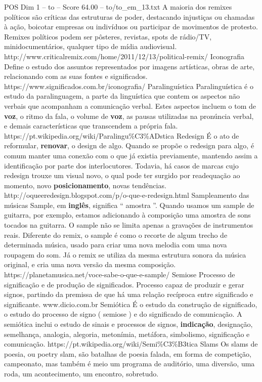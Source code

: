 \begin{textsample}{POS Dim 1 – to – Score 64.00 – to/to\_em\_13.txt}
A maioria dos remixes políticos são críticas das estruturas de poder, destacando injustiças ou chamadas à ação, boicotar empresas ou indivíduos ou participar de movimentos de protesto.
Remixes políticos podem ser pôsteres, revistas, spots de rádio/TV, minidocumentários, qualquer tipo de mídia audiovisual. http://www.criticalremix.com/home/2011/12/13/political-remix/ Iconografia Define o estudo dos assuntos representados por imagens artísticas, obras de arte, relacionando com as suas fontes e significados. https://www.significados.com.br/iconografia/ Paralinguística Paralinguística é o estudo da paralinguagem, a parte da linguística que contem os aspectos não verbais que acompanham a comunicação verbal.
Estes aspectos incluem o tom de \textbf{voz}, o ritmo da fala, o volume de \textbf{voz}, as pausas utilizadas na pronúncia verbal, e demais características que transcendem a própria fala. https://pt.wikipedia.org/wiki/Paralingu\%C3\%ADstica Redesign É o ato de reformular, \textbf{renovar}, o design de algo.
Quando se propõe o redesign para algo, é comum manter uma conexão com o que já existia previamente, mantendo assim a identificação por parte dos interlocutores.
Todavia, há casos de marcas cujo redesign trouxe um visual novo, o qual pode ter surgido por readequação ao momento, novo \textbf{posicionamento}, novas tendências. http://oqueeredesign.blogspot.com/p/o-que-e-redesign.html Sampleamento das músicas Sample, em \textbf{inglês}, significa “ amostra ”.
Quando usamos um sample de guitarra, por exemplo, estamos adicionando à composição uma amostra de sons tocados na guitarra.
O sample não se limita apenas a gravações de instrumentos reais.
Diferente do remix, o sample é como o recorte de algum trecho de determinada música, usado para criar uma nova melodia com uma nova roupagem do som.
Já o remix se utiliza da mesma estrutura sonora da música original, e cria uma nova versão da mesma composição. https://planetamusica.net/voce-sabe-o-que-e-sample/ Semiose Processo de significação e de produção de significados.
Processo capaz de produzir e gerar signos, partindo da premissa de que há uma relação recíproca entre significado e significante. www.dicio.com.br Semiótica É o estudo da construção de significado, o estudo do processo de signo ( semiose ) e do significado de comunicação.
A semiótica inclui o estudo de sinais e processos de signos, \textbf{indicação}, designação, semelhança, analogia, alegoria, metonímia, metáfora, simbolismo, significação e comunicação. https://pt.wikipedia.org/wiki/Semi\%C3\%B3tica Slams Os slams de poesia, ou poetry slam, são batalhas de poesia falada, em forma de competição, campeonato, mas também é meio um programa de auditório, uma diversão, uma roda, um acontecimento, um encontro, sobretudo.

\end{textsample}
